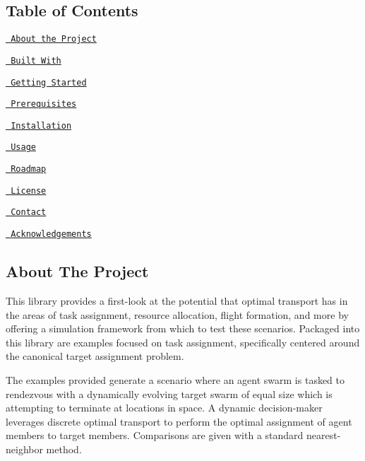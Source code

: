 \subsection*{Table of Contents}


\begin{DoxyItemize}
\item \href{\#about-the-project}{\texttt{ About the Project}}
\begin{DoxyItemize}
\item \href{\#built-with}{\texttt{ Built With}}
\end{DoxyItemize}
\item \href{\#getting-started}{\texttt{ Getting Started}}
\begin{DoxyItemize}
\item \href{\#prerequisites}{\texttt{ Prerequisites}}
\item \href{\#installation}{\texttt{ Installation}}
\end{DoxyItemize}
\item \href{\#usage}{\texttt{ Usage}}
\item \href{\#roadmap}{\texttt{ Roadmap}}
\item \href{\#license}{\texttt{ License}}
\item \href{\#contact}{\texttt{ Contact}}
\item \href{\#acknowledgements}{\texttt{ Acknowledgements}}
\end{DoxyItemize}

\subsection*{About The Project}

This library provides a first-\/look at the potential that optimal transport has in the areas of task assignment, resource allocation, flight formation, and more by offering a simulation framework from which to test these scenarios. Packaged into this library are examples focused on task assignment, specifically centered around the canonical target assignment problem.

The examples provided generate a scenario where an agent swarm is tasked to rendezvous with a dynamically evolving target swarm of equal size which is attempting to terminate at locations in space. A dynamic decision-\/maker leverages discrete optimal transport to perform the optimal assignment of agent members to target members. Comparisons are given with a standard nearest-\/neighbor method.

